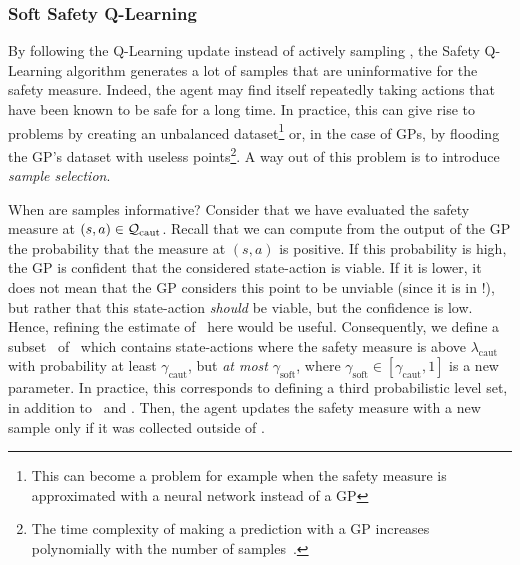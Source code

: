 \subsubsection{Soft Safety Q-Learning}
By following the Q-Learning update instead of actively sampling \LQhat, the Safety Q-Learning algorithm generates a lot of samples that are uninformative for the safety measure. Indeed, the agent may find itself repeatedly taking actions that have been known to be safe for a long time. In practice, this can give rise to problems by creating an unbalanced dataset\footnote{This can become a problem for example when the safety measure is approximated with a neural network instead of a GP} or, in the case of GPs, by flooding the GP's dataset with useless points\footnote{The time complexity of making a prediction with a GP increases polynomially with the number of samples~\cite{williams2006gaussian}.}. A way out of this problem is to introduce\emph{ sample selection}. \par
When are samples informative? Consider that we have evaluated the safety measure at $(s, a)\in\mathcal{Q}_\text{caut}$. Recall that we can compute from the output of the GP the probability that the measure at $(s, a)$ is positive. If this probability is high, the GP is confident that the considered state-action is viable. If it is lower, it does not mean that the GP considers this point to be unviable (since it is in \Qcaut !), but rather that this state-action\emph{ should} be viable, but the confidence is low. Hence, refining the estimate of \LQhat~here would be useful. Consequently, we define a subset \Qsoft~of \Qcaut~which contains state-actions where the safety measure is above $\lambda_\text{caut}$ with probability at least $\gamma_\text{caut}$, but\emph{ at most} $\gamma_\text{soft}$, where $\gamma_\text{soft}\in[\gamma_\text{caut}, 1]$ is a new parameter. In practice, this corresponds to defining a third probabilistic level set, in addition to \Qcaut~and \Qopt. Then, the agent updates the safety measure with a new sample only if it was collected outside of \Qsoft.%

